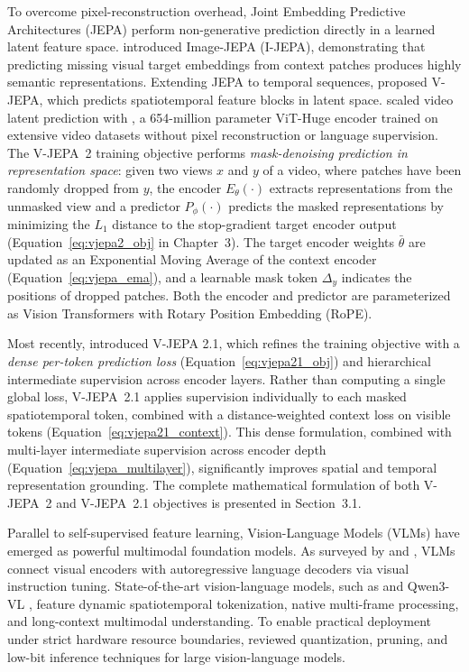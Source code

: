 To overcome pixel-reconstruction overhead, Joint Embedding Predictive Architectures (JEPA) perform non-generative prediction directly in a learned latent feature space. \citet{assran2023ijepa} introduced Image-JEPA (I-JEPA), demonstrating that predicting missing visual target embeddings from context patches produces highly semantic representations. Extending JEPA to temporal sequences, \citet{bardes2024vjepa} proposed V-JEPA, which predicts spatiotemporal feature blocks in latent space. \citet{assran2025vjepa2} scaled video latent prediction with {\vjepaa{}}, a 654-million parameter ViT-Huge encoder trained on extensive video datasets without pixel reconstruction or language supervision. The V-JEPA~2 training objective performs \emph{mask-denoising prediction in representation space}: given two views $x$ and $y$ of a video, where patches have been randomly dropped from $y$, the encoder $E_\theta(\cdot)$ extracts representations from the unmasked view and a predictor $P_\phi(\cdot)$ predicts the masked representations by minimizing the $L_1$ distance to the stop-gradient target encoder output (Equation~\ref{eq:vjepa2_obj} in Chapter~3). The target encoder weights $\bar{\theta}$ are updated as an Exponential Moving Average of the context encoder (Equation~\ref{eq:vjepa_ema}), and a learnable mask token $\Delta_y$ indicates the positions of dropped patches. Both the encoder and predictor are parameterized as Vision Transformers with Rotary Position Embedding (RoPE).

Most recently, \citet{murlabadia2026vjepa21} introduced V-JEPA 2.1, which refines the training objective with a \emph{dense per-token prediction loss} (Equation~\ref{eq:vjepa21_obj}) and hierarchical intermediate supervision across encoder layers. Rather than computing a single global loss, V-JEPA~2.1 applies supervision individually to each masked spatiotemporal token, combined with a distance-weighted context loss on visible tokens (Equation~\ref{eq:vjepa21_context}). This dense formulation, combined with multi-layer intermediate supervision across encoder depth (Equation~\ref{eq:vjepa_multilayer}), significantly improves spatial and temporal representation grounding. The complete mathematical formulation of both V-JEPA~2 and V-JEPA~2.1 objectives is presented in Section~3.1.

Parallel to self-supervised feature learning, Vision-Language Models (VLMs) have emerged as powerful multimodal foundation models. As surveyed by \citet{bordes2024vlm} and \citet{zhang2023vlmsurvey}, VLMs connect visual encoders with autoregressive language decoders via visual instruction tuning. State-of-the-art vision-language models, such as \qwenvl{} \citep{bai2025qwen2vl} and Qwen3-VL \citep{qwen2025qwen3vl}, feature dynamic spatiotemporal tokenization, native multi-frame processing, and long-context multimodal understanding. To enable practical deployment under strict hardware resource boundaries, \citet{pathak2026efficientvlms} reviewed quantization, pruning, and low-bit inference techniques for large vision-language models.

